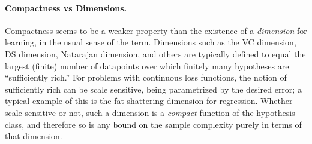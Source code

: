 \paragraph{Compactness vs Dimensions.} Compactness seems to be a weaker property than the existence of a \emph{dimension} for learning, in the usual sense of the term. Dimensions such as the VC dimension, DS dimension, Natarajan dimension, and others are typically defined to equal the largest (finite) number of datapoints over which finitely many hypotheses are ``sufficiently rich.'' For problems with continuous loss functions, the notion of sufficiently rich can be scale sensitive, being parametrized by the desired error; a typical example of this is the fat shattering dimension for regression.  Whether scale sensitive or not, such a dimension is a  \emph{compact} function of the hypothesis class, and therefore so is any bound on the sample complexity purely in terms of that dimension. %





